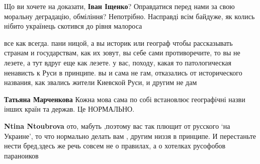 \begin{itemize}
\begin{itemize}
\begin{itemize}
\end{itemize}

 

Що ви хочете на доказати, \textbf{Іван Іщенко}? Оправдатися перед нами за свою моральну
деградацію, обміління? Непотрібно. Насправді всім байдуже, як колись нібито
українець скотився до рівня малороса

\end{itemize}

 

все как всегда. пани ницой, а вы историк или географ чтобы рассказывать странам
и государствам, как их зовут, вы себе сами противоречите, то вы не лезете, а
тут вдруг еще как лезете. у вас, походу, какая то патологическая ненависть к
Руси в принципе. вы и сама не гам, отказались от исторического названия, как
звались жители Киевской Руси, и другим не дам

\begin{itemize}
 
\textbf{Татьяна Марченкова} Кожна мова сама по собі встановлює географічні назви інших країн та держав. Це НОРМАЛЬНО.

\begin{itemize}
 
\textbf{Ntina Ntoubrova} ото, мабуть ,поэтому вас так плющит от русского ‘на Украине’, то что нормально делать вам , другим низзя в принципе. И перестаньте нести бред,здесь же речь совсем не о правилах, а о хотелках русофобов параноиков


\end{itemize}
\end{itemize}
\end{itemize}
